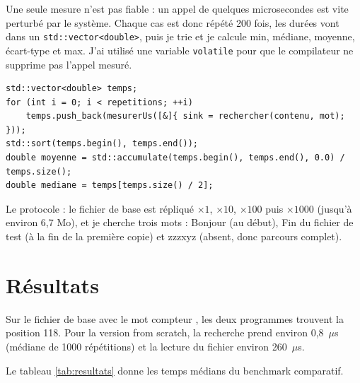 \documentclass[11pt,a4paper]{article}
\begin{document}
Une seule mesure n'est pas fiable : un appel de quelques microsecondes est vite perturbé
par le système. Chaque cas est donc répété 200 fois, les durées vont dans un
\texttt{std::vector<double>}, puis je trie et je calcule min, médiane, moyenne,
écart-type et max. J'ai utilisé une variable \texttt{volatile} pour que le compilateur ne
supprime pas l'appel mesuré.

\begin{lstlisting}[caption={Collecte et analyse des temps.}]
std::vector<double> temps;
for (int i = 0; i < repetitions; ++i)
    temps.push_back(mesurerUs([&]{ sink = rechercher(contenu, mot); }));
std::sort(temps.begin(), temps.end());
double moyenne = std::accumulate(temps.begin(), temps.end(), 0.0) / temps.size();
double mediane = temps[temps.size() / 2];
\end{lstlisting}

Le protocole : le fichier de base est répliqué $\times 1$, $\times 10$, $\times 100$ puis
$\times 1000$ (jusqu'à environ 6,7 Mo), et je cherche trois mots :
\og Bonjour \fg{} (au début), \og Fin du fichier de test \fg{} (à la fin de la première copie)
et \og zzzxyz \fg{} (absent, donc parcours complet).

\section{Résultats}

Sur le fichier de base avec le mot \og compteur \fg, les deux programmes trouvent
la position 118. Pour la version from scratch, la recherche prend environ 0,8~$\mu$s
(médiane de 1000 répétitions) et la lecture du fichier environ 260~$\mu$s.

Le tableau \ref{tab:resultats} donne les temps médians du benchmark comparatif.
\end{document}
